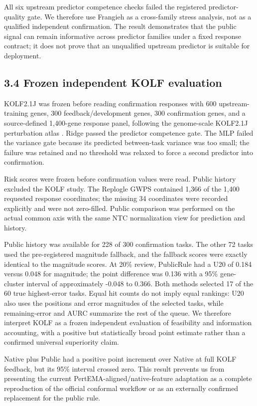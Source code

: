 \documentclass[journal]{IEEEtran}
\begin{document}
All six upstream predictor competence checks failed the registered predictor-quality gate. We therefore use Frangieh as a cross-family stress analysis, not as a qualified independent confirmation. The result demonstrates that the public signal can remain informative across predictor families under a fixed response contract; it does not prove that an unqualified upstream predictor is suitable for deployment.

\subsection{3.4 Frozen independent KOLF evaluation}

KOLF2.1J was frozen before reading confirmation responses with 600 upstream-training genes, 300 feedback/development genes, 300 confirmation genes, and a source-defined 1,400-gene response panel, following the genome-scale KOLF2.1J perturbation atlas \cite{nourreddine2026kolf}. Ridge passed the predictor competence gate. The MLP failed the variance gate because its predicted between-task variance was too small; the failure was retained and no threshold was relaxed to force a second predictor into confirmation.

Risk scores were frozen before confirmation values were read. Public history excluded the KOLF study. The Replogle GWPS \cite{replogle2022perturbseq} contained 1,366 of the 1,400 requested response coordinates; the missing 34 coordinates were recorded explicitly and were not zero-filled. Public comparison was performed on the actual common axis with the same NTC normalization view for prediction and history.

Public history was available for 228 of 300 confirmation tasks. The other 72 tasks used the pre-registered magnitude fallback, and the fallback scores were exactly identical to the magnitude scores. At 20\% review, PublicRule had a U20 of 0.184 versus 0.048 for magnitude; the point difference was 0.136 with a 95\% gene-cluster interval of approximately -0.048 to 0.366. Both methods selected 17 of the 60 true highest-error tasks. Equal hit counts do not imply equal rankings: U20 also uses the positions and error magnitudes of the selected tasks, while remaining-error and AURC summarize the rest of the queue. We therefore interpret KOLF as a frozen independent evaluation of feasibility and information accounting, with a positive but statistically broad point estimate rather than a confirmed universal superiority claim.

Native plus Public had a positive point increment over Native at full KOLF feedback, but its 95\% interval crossed zero. This result prevents us from presenting the current PertEMA-aligned/native-feature adaptation as a complete reproduction of the official conformal workflow or as an externally confirmed replacement for the public rule.
\end{document}
